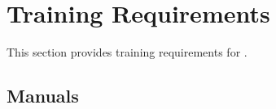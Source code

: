 \KNEADSECTIONNEWPAGE
\section{Training Requirements}
\label{lab:sec_Training}
% 

This section provides training requirements for \ThisSys.

\KNEADSUBSECTIONNEWPAGE
\subsection{Manuals}
\label{lab:sec_TrainingManuals}





% 



% 